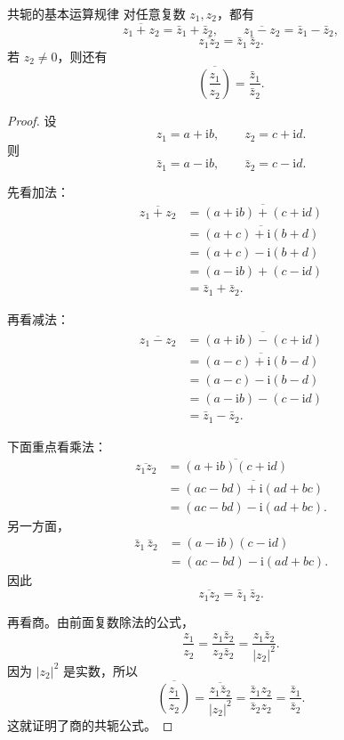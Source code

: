 \begin{dingli}{共轭的基本运算规律}{}
对任意复数 $z_1,z_2$，都有
\begin{equation}
    \overline{z_1+z_2}=\bar z_1+\bar z_2,\qquad
    \overline{z_1-z_2}=\bar z_1-\bar z_2,
\end{equation}
\begin{equation}
    \overline{z_1z_2}=\bar z_1\,\bar z_2.
\end{equation}
若 $z_2\neq 0$，则还有
\begin{equation}
    \overline{\left(\frac{z_1}{z_2}\right)}=\frac{\bar z_1}{\bar z_2}.
\end{equation}
\end{dingli}

\begin{proof}
设
\[
z_1=a+\mathrm{i}b,\qquad z_2=c+\mathrm{i}d.
\]
则
\[
\bar z_1=a-\mathrm{i}b,\qquad \bar z_2=c-\mathrm{i}d.
\]

先看加法：
\begin{align*}
    \overline{z_1+z_2}
    &=\overline{(a+\mathrm{i}b)+(c+\mathrm{i}d)} \\
    &=\overline{(a+c)+\mathrm{i}(b+d)} \\
    &=(a+c)-\mathrm{i}(b+d) \\
    &=(a-\mathrm{i}b)+(c-\mathrm{i}d) \\
    &=\bar z_1+\bar z_2.
\end{align*}

再看减法：
\begin{align*}
    \overline{z_1-z_2}
    &=\overline{(a+\mathrm{i}b)-(c+\mathrm{i}d)} \\
    &=\overline{(a-c)+\mathrm{i}(b-d)} \\
    &=(a-c)-\mathrm{i}(b-d) \\
    &=(a-\mathrm{i}b)-(c-\mathrm{i}d) \\
    &=\bar z_1-\bar z_2.
\end{align*}

下面重点看乘法：
\begin{align*}
    \overline{z_1z_2}
    &=\overline{(a+\mathrm{i}b)(c+\mathrm{i}d)} \\
    &=\overline{(ac-bd)+\mathrm{i}(ad+bc)} \\
    &=(ac-bd)-\mathrm{i}(ad+bc).
\end{align*}
另一方面，
\begin{align*}
    \bar z_1\,\bar z_2
    &=(a-\mathrm{i}b)(c-\mathrm{i}d) \\
    &=(ac-bd)-\mathrm{i}(ad+bc).
\end{align*}
因此
\[
\overline{z_1z_2}=\bar z_1\,\bar z_2.
\]

再看商。由前面复数除法的公式，
\[
\frac{z_1}{z_2}=\frac{z_1 \bar z_2}{z_2 \bar z_2}=\frac{z_1\bar z_2}{|z_2|^2}.
\]
因为 $|z_2|^2$ 是实数，所以
\[
\overline{\left(\frac{z_1}{z_2}\right)}
=\frac{\overline{z_1\bar z_2}}{|z_2|^2}
=\frac{\bar z_1 z_2}{\bar z_2 z_2}
=\frac{\bar z_1}{\bar z_2}.
\]
这就证明了商的共轭公式。
\end{proof}

